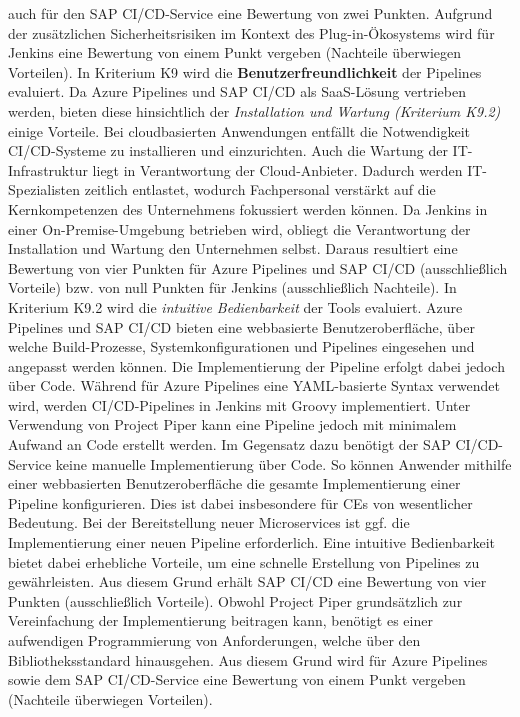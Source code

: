 auch für den SAP CI/CD-Service eine Bewertung von zwei Punkten. Aufgrund der zusätzlichen Sicherheitsrisiken im Kontext des Plug-in-Ökosystems wird für Jenkins eine Bewertung von einem Punkt vergeben (Nachteile überwiegen Vorteilen). In Kriterium K9 wird die \textbf{Benutzerfreundlichkeit} der Pipelines evaluiert. Da Azure Pipelines und SAP CI/CD als SaaS-Lösung vertrieben werden, bieten diese hinsichtlich der \textit{Installation und Wartung (Kriterium K9.2)} einige Vorteile. Bei cloudbasierten Anwendungen entfällt die Notwendigkeit CI/CD-Systeme zu installieren und einzurichten. Auch die Wartung der IT-Infrastruktur liegt in Verantwortung der Cloud-Anbieter. Dadurch werden IT-Spezialisten zeitlich entlastet, wodurch Fachpersonal verstärkt auf die Kernkompetenzen des Unternehmens fokussiert werden können. Da Jenkins in einer On-Premise-Umgebung betrieben wird, obliegt die Verantwortung der Installation und Wartung den Unternehmen selbst. Daraus resultiert eine Bewertung von vier Punkten für Azure Pipelines und SAP CI/CD (ausschließlich Vorteile) bzw. von null Punkten für Jenkins (ausschließlich Nachteile). In Kriterium K9.2 wird die \textit{intuitive Bedienbarkeit} der Tools evaluiert. Azure Pipelines und SAP CI/CD bieten eine webbasierte Benutzeroberfläche, über welche Build-Prozesse, Systemkonfigurationen und Pipelines eingesehen und angepasst werden können. Die Implementierung der Pipeline erfolgt dabei jedoch über Code. Während für Azure Pipelines eine YAML-basierte Syntax verwendet wird, werden CI/CD-Pipelines in Jenkins mit Groovy implementiert. Unter Verwendung von Project Piper kann eine Pipeline jedoch mit minimalem Aufwand an Code erstellt werden. Im Gegensatz dazu benötigt der SAP CI/CD-Service keine manuelle Implementierung über Code. So können Anwender mithilfe einer webbasierten Benutzeroberfläche die gesamte Implementierung einer Pipeline konfigurieren. Dies ist dabei insbesondere für CEs von wesentlicher Bedeutung. Bei der Bereitstellung neuer Microservices ist ggf. die Implementierung einer neuen Pipeline erforderlich. Eine intuitive Bedienbarkeit bietet dabei erhebliche Vorteile, um eine schnelle Erstellung von Pipelines zu gewährleisten. Aus diesem Grund erhält SAP CI/CD eine Bewertung von vier Punkten (ausschließlich Vorteile). Obwohl Project Piper grundsätzlich zur Vereinfachung der Implementierung beitragen kann, benötigt es einer aufwendigen Programmierung von Anforderungen, welche über den Bibliotheksstandard hinausgehen. Aus diesem Grund wird für Azure Pipelines sowie dem SAP CI/CD-Service eine Bewertung von einem Punkt vergeben (Nachteile überwiegen Vorteilen).
